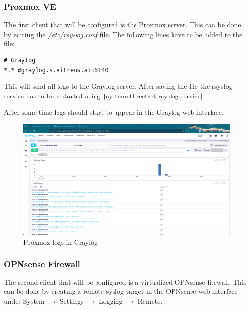 \subsubsection{Proxmox VE}

The first client that will be configured is the Proxmox server. This can be done by editing the \textit{/etc/rsyslog.conf} file. The following lines have to be added to the file:
\begin{verbatim}
# Graylog
*.* @graylog.s.vitreus.at:5140
\end{verbatim}
This will send all logs to the Graylog server. After saving the file the rsyslog service has to be restarted using \texttt|systemctl restart rsyslog.service|

After some time logs should start to appear in the Graylog web interface.
\begin{figure}[H]
	\centering
	\includegraphics[width=1\linewidth]{Figures/graylog-search-example-proxmox.png}
	\caption{Proxmox logs in Graylog}
\end{figure}

\subsubsection{OPNsense Firewall}

The second client that will be configured is a virtualized OPNsense firewall. This can be done by creating a remote syslog target in the OPNsense web interface under System $\rightarrow$ Settings $\rightarrow$ Logging $\rightarrow$ Remote.


